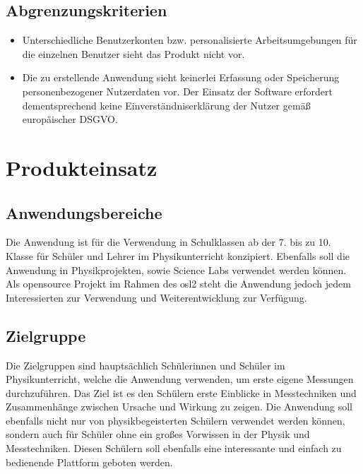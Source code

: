 \documentclass[parskip=full]{scrartcl}
\begin{document}
\subsection{Abgrenzungskriterien}

\begin{itemize}
	
	\item Unterschiedliche Benutzerkonten bzw. personalisierte Arbeitsumgebungen  für die einzelnen Benutzer sieht das Produkt nicht vor. 
	
	\item Die zu erstellende Anwendung sieht keinerlei Erfassung oder Speicherung personenbezogener Nutzerdaten vor. Der Einsatz der Software erfordert dementsprechend keine Einverständniserklärung der Nutzer gemäß europäischer \gls{DSGVO}.
	
\end{itemize}

\clearpage
\section{Produkteinsatz}\label{produkteinsatz}

\subsection{Anwendungsbereiche}

Die Anwendung ist für die Verwendung in Schulklassen ab der 7. bis zu 10. Klasse für Schüler und Lehrer im Physikunterricht konzipiert. Ebenfalls soll die Anwendung in Physikprojekten, sowie \gls{Science Labs} verwendet werden können. 
Als \gls{opensource} Projekt im Rahmen des \gls{osl2} steht die Anwendung jedoch jedem Interessierten zur Verwendung und Weiterentwicklung zur Verfügung.


\subsection{Zielgruppe}

Die Zielgruppen sind hauptsächlich Schülerinnen und Schüler im Physikunterricht, welche die Anwendung verwenden, um erste eigene Messungen durchzuführen. Das Ziel ist es den Schülern erste Einblicke in Messtechniken und Zusammenhänge zwischen Ursache und Wirkung zu zeigen. 
Die Anwendung soll ebenfalls nicht nur von physikbegeisterten Schülern verwendet werden können, sondern auch für Schüler ohne ein großes Vorwissen in der Physik und Messtechniken. Diesen Schülern soll ebenfalls eine interessante und einfach zu bedienende Plattform geboten werden.
\end{document}
